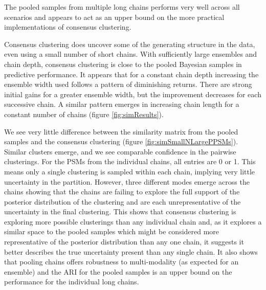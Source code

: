 \documentclass{bmcart}
\begin{document}
The pooled samples from multiple long chains performs very well across all scenarios and appears to act as an upper bound on the more practical implementations of consensus clustering.

Consensus clustering does uncover some of the generating structure in the data, even using a small number of short chains. With sufficiently large ensembles and chain depth, consensus clustering is close to the pooled Bayesian samples in predictive performance. It appears that for a constant chain depth increasing the ensemble width used follows a pattern of diminishing returns. There are strong initial gains for a greater ensemble width, but the improvement decreases for each successive chain. A similar pattern emerges in increasing chain length for a constant number of chains (figure \ref{fig:simResults}). 

We see very little difference between the similarity matrix from the pooled samples and the consensus clustering (figure \ref{fig:simSmallNLargePPSMs}). Similar clusters emerge, and we see comparable confidence in the pairwise clusterings. 
For the PSMs from the individual chains, all entries are 0 or 1. This means only a single clustering is sampled within each chain, implying very little uncertainty in the partition. However, three different modes emerge across the chains showing that the chains are failing to explore the full support of the posterior distribution of the clustering and are each unrepresentative of the uncertainty in the final clustering. This shows that consensus clustering is exploring more possible clusterings than any individual chain and, as it explores a similar space to the pooled samples which might be considered more representative of the posterior distribution than any one chain, it suggests it better describes the true uncertainty present than any single chain. It also shows that pooling chains offers robustness to multi-modality (as expected for an ensemble) and the ARI for the pooled samples is an upper bound on the performance for the individual long chains.
\end{document}
